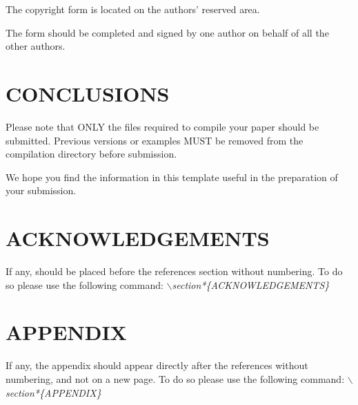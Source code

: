 \documentclass[a4paper,twoside]{article}
\begin{document}
The copyright form is located on the authors' reserved area.

The form should be completed and signed by one author on
behalf of all the other authors.

\section{\uppercase{Conclusions}}
\label{sec:conclusion}

\noindent Please note that ONLY the files required to compile your paper should be submitted. Previous versions or examples MUST be removed from the compilation directory before submission.

We hope you find the information in this template useful in the preparation of your submission.

\section*{\uppercase{Acknowledgements}}

\noindent If any, should be placed before the references section
without numbering. To do so please use the following command:
\textit{$\backslash$section*\{ACKNOWLEDGEMENTS\}}





{\small
}



\section*{\uppercase{Appendix}}

\noindent If any, the appendix should appear directly after the
references without numbering, and not on a new page. To do so please use the following command:
\textit{$\backslash$section*\{APPENDIX\}}

\vfill
\end{document}
